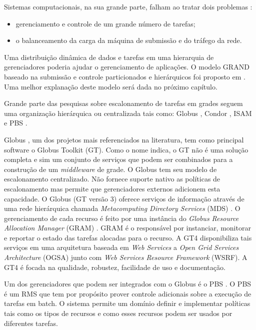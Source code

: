 Sistemas computacionais, na sua grande parte, falham ao tratar dois problemas \cite{Mangan2006}: 

\begin{itemize}
	\item gerenciamento e controle de um grande número de tarefas; 
	\item o balanceamento da carga da máquina de submissão e do tráfego da rede.
\end{itemize}

Uma distribuição dinâmica de dados e tarefas em uma hierarquia de gerenciadores poderia ajudar o gerenciamento de aplicações. O modelo GRAND baseado na submissão e controle particionados e hierárquicos foi proposto em \cite{Mangan2006}. Uma melhor explanação deste modelo será dada no próximo capítulo.

Grande parte das pesquisas sobre escalonamento de tarefas em grades seguem uma organização hierárquica ou centralizada tais como: Globus \cite{Foster1998}, Condor \cite{condor2007}, ISAM \cite{isam} e PBS \cite{Bayucan1998}.

Globus \cite{Globus}, um dos projetos mais referenciados na literatura, tem como principal software o Globus Toolkit (GT). Como o nome indica, o GT não é uma solução completa e sim um conjunto de serviços que podem ser combinados para a construção de um \emph{middleware} de grade. O Globus \cite{Foster1998} tem seu modelo de escalonamento centralizado. Não fornece suporte nativo as políticas de escalonamento mas permite que gerenciadores externos adicionem esta capacidade. O Globus (GT versão 3) oferece serviços de informação através de uma rede hierárquica chamada \emph{Metacomputing Directory Services} (MDS) \cite{Santos}. O gerenciamento de cada recurso é feito por uma instância do {\it Globus Resource Allocation Manager} (GRAM) \cite{Andrade2002}. GRAM é o responsável por instanciar, monitorar e reportar o estado das tarefas alocadas para o recurso. A GT4 \cite{Leon2006} disponibiliza tais serviços em uma arquitetura baseada em {\it Web Services} a {\it Open Grid Services Architecture} (OGSA) junto com {\it Web Services Resource Framework} (WSRF). A GT4 é focada na qualidade, robustez, facilidade de uso e documentação.

Um dos gerenciadores que podem ser integrados com o Globus é o PBS \cite{Bayucan1998}. O PBS é um RMS que tem por propósito prover controle adicionais sobre a execução de tarefas em batch. O sistema permite um domínio definir e implementar políticas tais como os tipos de recursos e como esses recursos podem ser usados por diferentes tarefas.


